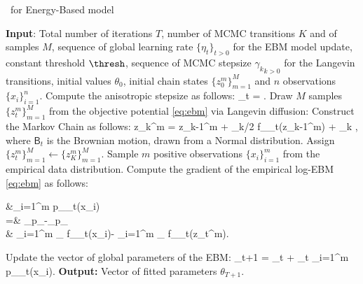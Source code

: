 \documentclass[10pt,twocolumn,letterpaper]{article}
\begin{document}
\begin{algorithm}[t]
\caption{\algo\ for Energy-Based model} \label{alg:anila}
\begin{algorithmic}[1]
\STATE \textbf{Input}: Total number of iterations $T$, number of MCMC transitions $K$ and of samples $M$, sequence of global learning rate $\{\eta_t\}_{t >0}$ for the EBM model update, constant threshold $\thresh$,  sequence of MCMC stepsize ${\gamma_k}_{k >0}$ for the Langevin transitions, initial values $\theta_0$, initial chain states $\{ z_{0}^m \}_{m=1}^M$ and $n$ observations $\{ x_{i} \}_{i=1}^n$.
\STATE Compute the anisotropic stepsize as follows: \label{line:step}
\beq\label{eq:step}
\stepsize_t =  \eqsp.
\eeq
\STATE Draw $M$ samples $\{ z_{t}^m \}_{m=1}^M$ from the objective potential \eqref{eq:ebm} via Langevin diffusion:\label{line:langevin}
\STATE Construct the Markov Chain as follows:
\beq\label{eq:anila}
z_{k}^{m} = z_{k-1}^m + \stepsize_k/2  \nabla f_{\theta_t}(z_{k-1}^m) +  _k \eqsp,
\eeq
where $\mathsf{B}_t$ is the Brownian motion, drawn from a Normal distribution.
\ENDFOR
\STATE Assign $\{ z_{t}^m \}_{m=1}^M \leftarrow \{ z_{K}^m \}_{m=1}^M$.
\STATE Sample $m$ positive observations $\{ x_{i} \}_{i=1}^m$ from the empirical data distribution.
\STATE Compute the gradient of the empirical log-EBM \eqref{eq:ebm} as follows:
\beq\notag
\begin{split}
&\nabla \sum_{i=1}^m \log p_{\theta_t}(x_i) \\
 =& _{p_{}}-_{p_{\theta}}\\
 \approx &  \sum_{i=1}^{m} \nabla_{\theta} f_{\theta_t}\left(x_{i}\right)- \sum_{i=1}^{m} \nabla_{\theta} f_{\theta_t}\left(z_t^m\right)\eqsp.
\end{split}
\eeq
\STATE Update the vector of global parameters of the EBM:\label{line:gradient}
\beq\notag
\theta_{t+1} = \theta_{t} + \eta_t \nabla \sum_{i=1}^m \log p_{\theta_t}(x_i)\eqsp.
\eeq
\ENDFOR
\STATE \textbf{Output:} Vector of fitted parameters $\theta_{T+1}$.
\end{algorithmic}
\end{algorithm}
\end{document}
